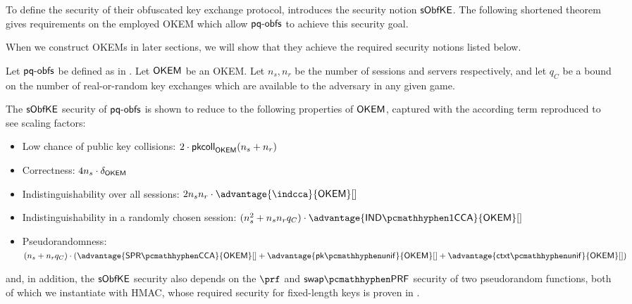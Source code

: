 To define the security of their obfuscated key exchange protocol, \cite{CCS:GunSteVei24} introduces the security notion $\mathsf{sObfKE}$. The following shortened theorem gives requirements on the employed OKEM which allow $\textsf{pq-obfs}$ to achieve this security goal.

When we construct OKEMs in later sections, we will show that they achieve the required security notions listed below.

\begin{theorem}\label{thm:s-obfuscated-keyex-security}
    Let $\textsf{pq-obfs}$ be defined as in \cite[Fig. 7]{CCS:GunSteVei24}. Let $\mathsf{OKEM}$ be an OKEM.
    Let $n_s, n_r$ be the number of sessions and servers respectively, and let $q_C$ be a bound on the number of real-or-random key exchanges which are available to the adversary in any given game.
    
    The $\mathsf{sObfKE}$ security of $\textsf{pq-obfs}$ is shown to reduce to the following properties of $\mathsf{OKEM}$, captured with the according term reproduced to see scaling factors:
    \begin{itemize}
        \item Low chance of public key collisions: $2 \cdot \mathsf{pkcoll}_{\mathsf{OKEM}}(n_s+n_r)$
        \item Correctness: $4n_s \cdot \delta_{\mathsf{OKEM}}$
        \item Indistinguishability over all sessions: $2 n_s n_r \cdot \advantage{\indcca}{\OKEM}[]$
        \item Indistinguishability in a randomly chosen session: $(n_s^2 + n_s n_r q_C) \cdot \advantage{\indonecca}{\OKEM}[]$
        \item Pseudorandomness: $(n_s + n_r q_C) \cdot (\advantage{\sprcca}{\OKEM}[] + \advantage{\pkunif}{\OKEM}[] + \advantage{\ctxtunif}{\OKEM}[])$
    \end{itemize}

    and, in addition, the $\mathsf{sObfKE}$ security also depends on the $\prf$ and $\swapprf$ security of two pseudorandom functions, both of which we instantiate with HMAC, whose required security for fixed-length keys is proven in \cite{C:BBGS23}.
\end{theorem}